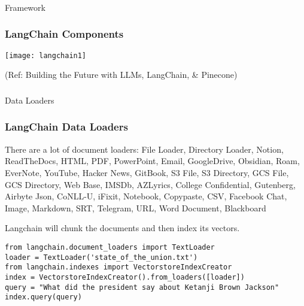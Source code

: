 \begin{frame}[fragile]\frametitle{}
\begin{center}
{\Large Framework}
\end{center}
\end{frame}

\begin{frame}[fragile]\frametitle{LangChain Components}

\begin{center}
\texttt{[image: langchain1]}
\end{center}	  

{\tiny (Ref: Building the Future with LLMs, LangChain, \& Pinecone)}
\end{frame}

\begin{frame}[fragile]\frametitle{}
\begin{center}
{\Large Data Loaders}
\end{center}
\end{frame}

\begin{frame}[fragile]\frametitle{LangChain Data Loaders}

There are a lot of document loaders: File Loader, Directory Loader, Notion, ReadTheDocs, HTML, PDF, PowerPoint, Email, GoogleDrive, Obsidian, Roam, EverNote, YouTube, Hacker News, GitBook, S3 File, S3 Directory, GCS File, GCS Directory, Web Base, IMSDb, AZLyrics, College Confidential, Gutenberg, Airbyte Json, CoNLL-U, iFixit, Notebook, Copypaste, CSV, Facebook Chat, Image, Markdown, SRT, Telegram, URL, Word Document, Blackboard

Langchain will chunk the documents and then index its vectors.

\begin{lstlisting}
from langchain.document_loaders import TextLoader
loader = TextLoader('state_of_the_union.txt')
from langchain.indexes import VectorstoreIndexCreator
index = VectorstoreIndexCreator().from_loaders([loader])
query = "What did the president say about Ketanji Brown Jackson"
index.query(query)
\end{lstlisting}	  

\end{frame}



